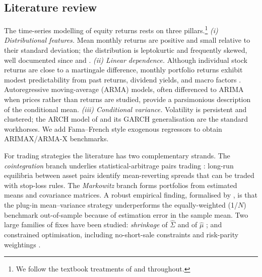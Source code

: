 \documentclass[11pt,a4paper]{article}
\begin{document}
\subsection{Literature review}
The time-series modelling of equity returns rests on three pillars.\footnote{We follow the textbook treatments of \citet{Tsay2010} and \citet{HamiltonTS} throughout.} \emph{(i) Distributional features.} Mean monthly returns are positive and small relative to their standard deviation; the distribution is leptokurtic and frequently skewed, well documented since \citet{FamaFat1965} and \citet{Mandelbrot1963}. \emph{(ii) Linear dependence.} Although individual stock returns are close to a martingale difference, monthly portfolio returns exhibit modest predictability from past returns, dividend yields, and macro factors \citep{CampbellShiller1988,KeimStambaugh1986,WelchGoyal2008}. Autoregressive moving-average (ARMA) models, often differenced to ARIMA when prices rather than returns are studied, provide a parsimonious description of the conditional mean. \emph{(iii) Conditional variance.} Volatility is persistent and clustered; the ARCH model of \citet{Engle1982} and its GARCH generalisation \citep{Bollerslev1986} are the standard workhorses. We add Fama--French style exogenous regressors to obtain ARIMAX/ARMA-X benchmarks.

For trading strategies the literature has two complementary strands. The \emph{cointegration} branch \citep{EngleGranger1987,Johansen1991} underlies statistical-arbitrage pairs trading \citep{GatevGoetzmannRouwenhorst2006,Krauss2017}: long-run equilibria between asset pairs identify mean-reverting spreads that can be traded with stop-loss rules. The \emph{Markowitz} branch \citep{Markowitz1952,SharpeCAPM,JagannathanMa2003} forms portfolios from estimated means and covariance matrices. A robust empirical finding, formalised by \citet{DeMiguelGarlappiUppal2009}, is that the plug-in mean--variance strategy underperforms the equally-weighted (1/$N$) benchmark out-of-sample because of estimation error in the sample mean. Two large families of fixes have been studied: \emph{shrinkage} of $\hat{\Sigma}$ \citep{LedoitWolf2004} and of $\hat{\mu}$ \citep{Jorion1986}; and constrained optimisation, including no-short-sale constraints \citep{JagannathanMa2003} and risk-parity weightings \citep{Maillard2010}.
\end{document}
